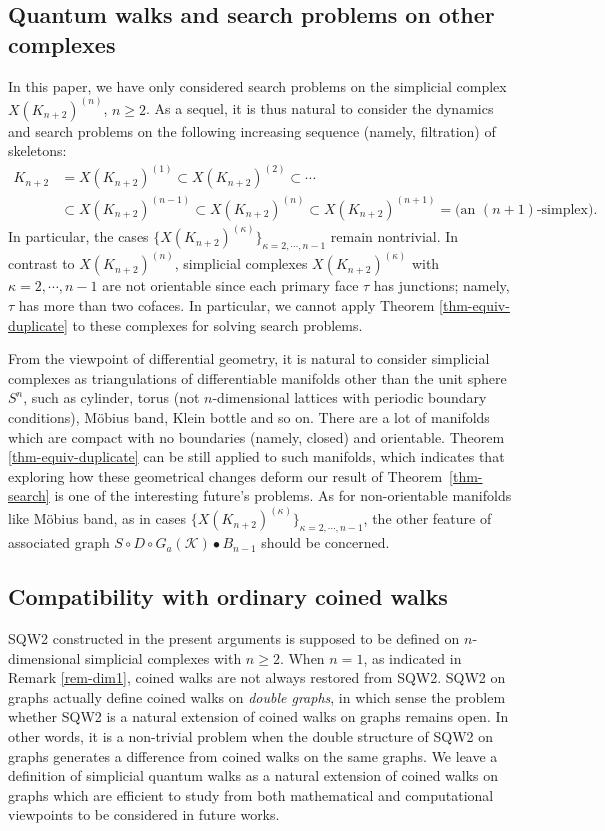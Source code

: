 \documentclass[a4paper,12pt]{article}
\numberwithin{equation}{section}
\begin{document}
\subsection{Quantum walks and search problems on other complexes}
In this paper, we have only considered search problems on the simplicial complex $X(K_{n+2})^{(n)}$, $n\geq 2$.
As a sequel, it is thus natural to consider the dynamics and search problems on the following increasing sequence (namely, filtration) of skeletons:
\begin{align*}
K_{n+2} &= X(K_{n+2})^{(1)} \subset X(K_{n+2})^{(2)} \subset \cdots \\
	&\subset X(K_{n+2})^{(n-1)} \subset X(K_{n+2})^{(n)}\subset X(K_{n+2})^{(n+1)} = \text{(an $(n+1)$-simplex)}.
\end{align*}
In particular, the cases $\{X(K_{n+2})^{(\kappa)}\}_{\kappa = 2,\cdots, n-1}$ remain nontrivial.
In contrast to $X(K_{n+2})^{(n)}$, simplicial complexes $X(K_{n+2})^{(\kappa)}$ with $\kappa = 2,\cdots, n-1$ are not orientable since each primary face $\tau$ has junctions; namely, $\tau$ has more than two cofaces.
In particular, we cannot apply Theorem \ref{thm-equiv-duplicate} to these complexes for solving search problems.

\par
From the viewpoint of differential geometry, it is natural to consider simplicial complexes as triangulations of differentiable manifolds other than the unit sphere $S^n$, such as cylinder, torus (not $n$-dimensional lattices with periodic boundary conditions), M\"{o}bius band, Klein bottle and so on.
There are a lot of manifolds which are compact with no boundaries (namely, closed) and orientable. 
Theorem \ref{thm-equiv-duplicate} can be still applied to such manifolds, 
which indicates that exploring how these geometrical changes deform our result of Theorem~\ref{thm-search} is one of the interesting future's problems.
As for non-orientable manifolds like M\"{o}bius band, as in cases $\{X(K_{n+2})^{(\kappa)}\}_{\kappa = 2,\cdots, n-1}$,  the other feature of associated graph $S\circ D\circ G_{a}(\mathcal{K}) \bullet B_{n-1}$ should be concerned.

\subsection{Compatibility with ordinary coined walks}
SQW2 constructed in the present arguments is supposed to be defined on $n$-dimensional simplicial complexes with $n\geq 2$.
When $n=1$, as indicated in Remark \ref{rem-dim1}, coined walks are not always restored from SQW2.
SQW2 on graphs actually define coined walks on {\em double graphs}, in which sense the problem whether SQW2 is a natural extension of coined walks on graphs remains open.
In other words, it is a non-trivial problem when the double structure of SQW2 on graphs generates a difference from coined walks on the same graphs.
We leave a definition of simplicial quantum walks as a natural extension of coined walks on graphs which are efficient to study from both mathematical and computational viewpoints to be considered in future works.
\end{document}
